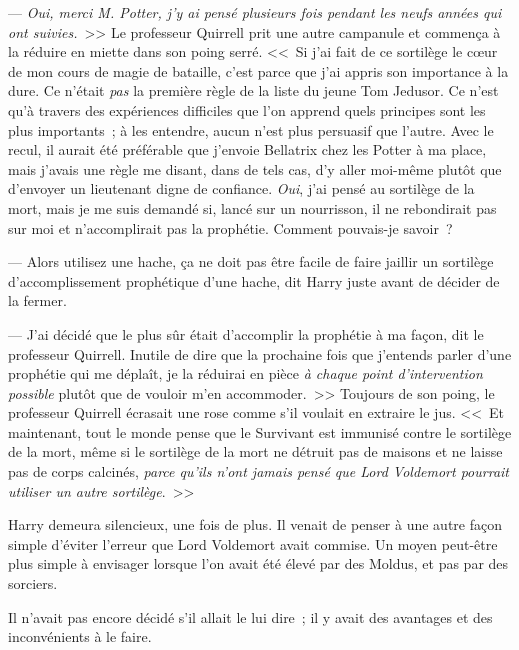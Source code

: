 --- \emph{Oui, merci M. Potter, j'y ai pensé plusieurs fois pendant les neufs années qui ont suivies.}~>> Le professeur Quirrell prit une autre campanule et commença à la réduire en miette dans son poing serré. <<~Si j'ai fait de ce sortilège le cœur de mon cours de magie de bataille, c'est parce que j'ai appris son importance à la dure. Ce n'était \emph{pas} la première règle de la liste du jeune Tom Jedusor. Ce n'est qu'à travers des expériences difficiles que l'on apprend quels principes sont les plus importants~; à les entendre, aucun n'est plus persuasif que l'autre. Avec le recul, il aurait été préférable que j'envoie Bellatrix chez les Potter à ma place, mais j'avais une règle me disant, dans de tels cas, d'y aller moi-même plutôt que d'envoyer un lieutenant digne de confiance. \emph{Oui}, j'ai pensé au sortilège de la mort, mais je me suis demandé si, lancé sur un nourrisson, il ne rebondirait pas sur moi et n'accomplirait pas la prophétie. Comment pouvais-je savoir~?

--- Alors utilisez une hache, ça ne doit pas être facile de faire jaillir un sortilège d'accomplissement prophétique d'une hache, dit Harry juste avant de décider de la fermer.

--- J'ai décidé que le plus sûr était d'accomplir la prophétie à ma façon, dit le professeur Quirrell. Inutile de dire que la prochaine fois que j'entends parler d'une prophétie qui me déplaît, je la réduirai en pièce \emph{à chaque point d'intervention possible} plutôt que de vouloir m'en accommoder.~>> Toujours de son poing, le professeur Quirrell écrasait une rose comme s'il voulait en extraire le jus. <<~Et maintenant, tout le monde pense que le Survivant est immunisé contre le sortilège de la mort, même si le sortilège de la mort ne détruit pas de maisons et ne laisse pas de corps calcinés, \emph{parce qu'ils n'ont jamais pensé que Lord Voldemort pourrait utiliser un autre sortilège}.~>>

Harry demeura silencieux, une fois de plus. Il venait de penser à une autre façon simple d'éviter l'erreur que Lord Voldemort avait commise. Un moyen peut-être plus simple à envisager lorsque l'on avait été élevé par des Moldus, et pas par des sorciers.

Il n'avait pas encore décidé s'il allait le lui dire~; il y avait des avantages et des inconvénients à le faire.

